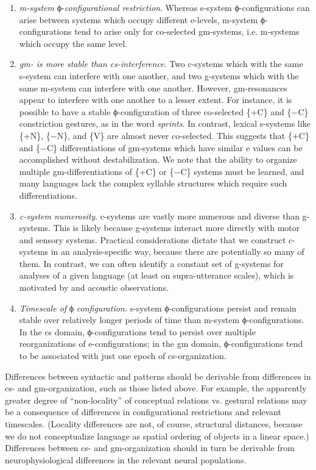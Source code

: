 \begin{enumerate}
\item \textit{m-system} ϕ-\textit{configurational restriction}. Whereas s-system ϕ-configurations can arise between systems which occupy different e-levels, m-system ϕ-configurations tend to arise only for co-selected gm-systems, i.e. m-sys\-tems which occupy the same level. 

\item \textit{gm- is more stable than cs-interference}. Two c-systems which  with the same s-system can interfere with one another, and two g-systems which  with the same m-system can interfere with one another. However, gm-resonances appear to interfere with one another to a lesser extent. For instance, it is possible to have a stable ϕ-configuration of three co-selected \{+C\} and \{−C\} constriction gestures, as in the word \textit{sprints}. In contrast, lexical s-systems like \{+N\}, \{−N\}, and \{V\} are almost never co-selected. This suggests that \{+C\} and \{−C\} differentiations of gm-systems which have similar e values can be accomplished without destabilization. We note that the ability to organize multiple gm-differentiations of \{+C\} or \{−C\} systems must be learned, and many languages lack the complex syllable structures which require such differentiations.

\item \textit{c-system numerosity}. c-systems are vastly more numerous and diverse than g-systems. This is likely because g-systems interact more directly with motor and sensory systems. Practical considerations dictate that we construct c-systems in an analysis-specific way, because there are potentially so many of them. In contrast, we can often identify a constant set of g-systems for analyses of a given language (at least on supra-utterance scales), which is motivated  by  and acoustic observations.

\item  \textit{Timescale of} ϕ \textit{configuration.} s-system ϕ-configurations persist and remain stable over relatively longer periods of time than m-system ϕ-con\-fig\-u\-ra\-tions. In the cs domain, ϕ-configurations tend to persist over multiple reorganizations of e-configurations; in the gm domain, ϕ-configurations tend to be associated with just one epoch of cs-organization.
\end{enumerate}

  Differences between syntactic and  patterns should be derivable from differences in cs- and gm-or\-ga\-ni\-za\-tion, such as those listed above. For example, the apparently greater degree of “non-locality” of conceptual relations vs. gestural relations may be a consequence of differences in configurational restrictions and relevant timescales. (Locality differences are not, of course, structural distances, because we do not conceptualize language as spatial ordering of objects in a linear space.) Differences between cs- and gm-or\-ga\-ni\-za\-tion should in turn be derivable from neurophysiological differences in the relevant neural populations.

